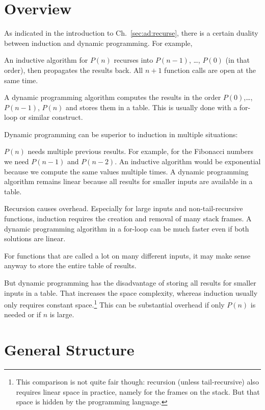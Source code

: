 \section{Overview}

As indicated in the introduction to Ch.~\ref{sec:ad:recurse}, there is a certain duality between induction and dynamic programming.
For example,
\begin{compactitem}
 \item An inductive algorithm for $P(n)$ recurses into $P(n-1)$, \ldots, $P(0)$ (in that order), then propagates the results back.
  All $n+1$ function calls are open at the same time.
 \item A dynamic programming algorithm computes the results in the order $P(0)$,\ldots, $P(n-1)$, $P(n)$ and stores them in a table.
  This is usually done with a for-loop or similar construct.
\end{compactitem}

Dynamic programming can be superior to induction in multiple situations:
\begin{compactitem}
 \item $P(n)$ needs multiple previous results.
 For example, for the Fibonacci numbers we need $P(n-1)$ and $P(n-2)$.
 An inductive algorithm would be exponential because we compute the same values multiple times.
 A dynamic programming algorithm remains linear because all results for smaller inputs are available in a table.
 \item Recursion causes overhead.
 Especially for large inputs and non-tail-recursive functions, induction requires the creation and removal of many stack frames.
 A dynamic programming algorithm in a for-loop can be much faster even if both solutions are linear.
 \item For functions that are called a lot on many different inputs, it may make sense anyway to store the entire table of results.
\end{compactitem}

But dynamic programming has the disadvantage of storing all results for smaller inputs in a table.
That increases the space complexity, whereas induction usually only requires constant space.\footnote{This comparison is not quite fair though: recursion (unless tail-recursive) also requires linear space in practice, namely for the frames on the stack. But that space is hidden by the programming language.}
This can be substantial overhead if only $P(n)$ is needed or if $n$ is large.

\section{General Structure}

